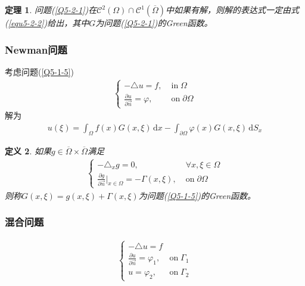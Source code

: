 \documentclass[11pt, a4paper]{article}
\theoremstyle{theorem}
\newtheorem{thm}{定理}[section]
\newtheorem{definition}[thm]{定义}
\newcommand{\intd}[1]{\,\mathrm{d}{#1}}
\begin{document}
\begin{thm}
    问题(\ref{Q5-2-1})在$\mathcal{C}^2(\Omega) \cap \mathcal{C}^1(\overline{\Omega})$中如果有解，则解的表达式一定由式(\ref{equ5-2-2})给出，其中$G$为问题(\ref{Q5-2-1})的Green函数。
\end{thm}

\subsubsection{Newman问题}

考虑问题(\ref{Q5-1-5})
\begin{align*}
    \begin{cases}
        - \triangle u = f, &\; \text{in} \; \Omega \\
        \frac{\partial u}{\partial \vec{n}} = \varphi, &\; \text{on} \; \partial \Omega
    \end{cases}
\end{align*}
解为
\begin{align}
    u(\xi) = \int_\Omega f(x) G(x,\xi) \intd x - \int_{\partial \Omega} \varphi(x) G(x,\xi) \intd S_x
\end{align}

\begin{definition}
    如果$g \in \overline{\Omega} \times \overline{\Omega}$满足
    \begin{align}
        \begin{cases}
            - \triangle_x g = 0, \; &\forall x,\xi \in \Omega \\
            \frac{\partial g}{\partial \vec{n}} \bigg|_{x \in \Omega} = - \Gamma(x,\xi), \; &\text{on} \; \partial \Omega
        \end{cases}
    \end{align}
    则称$G(x,\xi) = g(x,\xi) + \Gamma(x,\xi)$为问题(\ref{Q5-1-5})的Green函数。
\end{definition}

\subsubsection{混合问题}

\begin{align}
    \label{Q5-2-3}
    \begin{cases}
        - \triangle u = f \\
        \frac{\partial u}{\partial \vec{n}} = \varphi_1, \; &\text{on} \; \Gamma_1 \\
        u = \varphi_2, \; &\text{on} \; \Gamma_2
    \end{cases}
\end{align}
\end{document}
